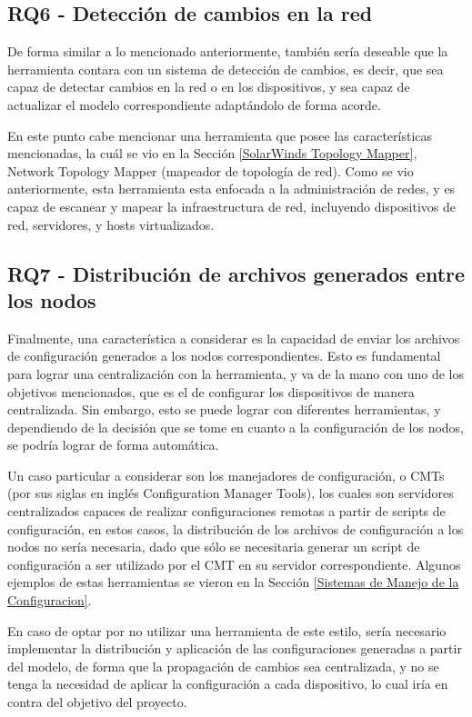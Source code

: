 \subsection{RQ6 - Detección de cambios en la red} \label{RQ6}
De forma similar a lo mencionado anteriormente, también sería deseable que la herramienta contara con un sistema de detección de cambios, es decir, que sea capaz de detectar cambios en la red o en los dispositivos, y sea capaz de actualizar el modelo correspondiente adaptándolo de forma acorde.

En este punto cabe mencionar una herramienta que posee las características mencionadas, la cuál se vio en la Sección \ref{SolarWinds Topology Mapper}, Network Topology Mapper (mapeador de topología de red). Como se vio anteriormente, esta herramienta esta enfocada a la administración de redes, y es capaz de escanear y mapear la infraestructura de red, incluyendo dispositivos de red, servidores, y hosts virtualizados.

\subsection{RQ7 - Distribución de archivos generados entre los nodos} \label{RQ7}
Finalmente, una característica a considerar es la capacidad de enviar los archivos de configuración generados a los nodos correspondientes. Esto es fundamental para lograr una centralización con la herramienta, y va de la mano con uno de  los objetivos mencionados, que es el de configurar los dispositivos de manera centralizada. Sin embargo, esto se puede lograr con diferentes herramientas, y dependiendo de la decisión que se tome en cuanto a la configuración de los nodos, se podría lograr de forma automática. 

Un caso particular a considerar son los manejadores de configuración, o CMTs (por sus siglas en inglés Configuration Manager Tools), los cuales son servidores centralizados capaces de realizar configuraciones remotas a partir de scripts de configuración, en estos casos, la distribución de los archivos de configuración a los nodos no sería necesaria, dado que sólo se necesitaria generar un script de configuración a ser utilizado por el CMT en su servidor correspondiente. Algunos ejemplos de estas herramientas se vieron en la Sección \ref{Sistemas de Manejo de la Configuracion}.

En caso de optar por no utilizar una herramienta de este estilo, sería necesario implementar la distribución y aplicación de las configuraciones generadas a partir del modelo, de forma que la propagación de cambios sea centralizada, y no se tenga la necesidad de aplicar la configuración a cada dispositivo, lo cual iría en contra del objetivo del proyecto.

